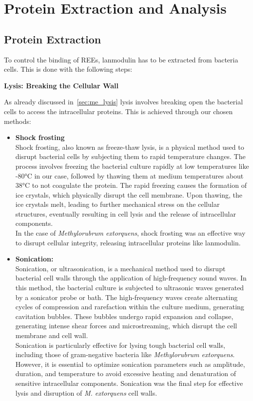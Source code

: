 \section{Protein Extraction and Analysis\authorB{}}
\subsection{Protein Extraction}
To control the binding of REEs, lanmodulin has to be extracted from bacteria cells.
This is done with the following steps:

\textbf{Lysis: Breaking the Cellular Wall}

As already discussed in~\ref{sec:me_lysis} lysis involves breaking open the bacterial cells to access the intracellular proteins.
This is achieved through our chosen methods:

\begin{itemize}
    \item \textbf{Shock frosting} \\
    Shock frosting, also known as freeze-thaw lysis, is a physical method used to disrupt
    bacterial cells by subjecting them to rapid temperature changes.
    The process involves freezing the bacterial culture rapidly at low temperatures like -80°C in our case, followed by thawing them at medium temperatures about 38°C to not coagulate the protein.
    The rapid freezing causes the formation of ice crystals, which physically
    disrupt the cell membrane.
    Upon thawing, the ice crystals melt, leading to further
    mechanical stress on the cellular structures, eventually resulting in cell lysis and the release of intracellular components. \\
    In the case of \emph{Methylorubrum extorquens}, shock frosting was an effective way to
    disrupt cellular integrity, releasing intracellular proteins like lanmodulin.

    \item \textbf{Sonication:} \\
    Sonication, or ultrasonication, is a mechanical method used to disrupt bacterial cell
    walls through the application of high-frequency sound waves.
    In this method, the bacterial culture is subjected to ultrasonic waves generated by a sonicator probe or bath.
    The high-frequency waves create alternating cycles of compression and rarefaction within the culture medium, generating cavitation bubbles.
    These bubbles undergo rapid expansion and collapse, generating intense shear forces and
    microstreaming, which disrupt the cell membrane and cell wall. \\
    Sonication is particularly effective for lysing tough bacterial cell walls, including those of gram-negative bacteria like \emph{Methylorubrum extorquens}.
    However, it is essential to optimize sonication parameters such as amplitude, duration, and temperature to avoid excessive heating and denaturation of sensitive intracellular components.
    Sonication was the final step for effective lysis and disruption of \emph{M. extorquens} cell walls.
\end{itemize}

